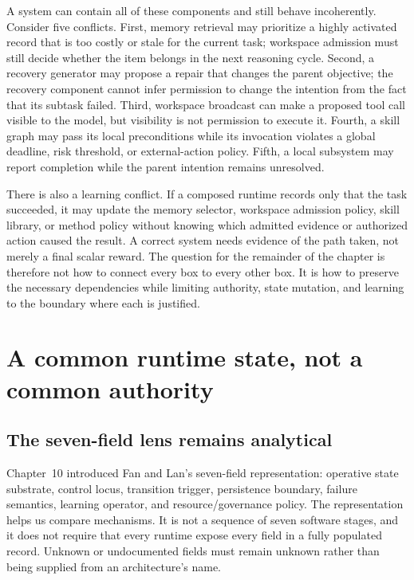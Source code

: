 A system can contain all of these components and still behave incoherently. Consider five conflicts. First, memory retrieval may prioritize a highly activated record that is too costly or stale for the current task; workspace admission must still decide whether the item belongs in the next reasoning cycle. Second, a recovery generator may propose a repair that changes the parent objective; the recovery component cannot infer permission to change the intention from the fact that its subtask failed. Third, workspace broadcast can make a proposed tool call visible to the model, but visibility is not permission to execute it. Fourth, a skill graph may pass its local preconditions while its invocation violates a global deadline, risk threshold, or external-action policy. Fifth, a local subsystem may report completion while the parent intention remains unresolved.

There is also a learning conflict. If a composed runtime records only that the task succeeded, it may update the memory selector, workspace admission policy, skill library, or method policy without knowing which admitted evidence or authorized action caused the result. A correct system needs evidence of the path taken, not merely a final scalar reward. The question for the remainder of the chapter is therefore not how to connect every box to every other box. It is how to preserve the necessary dependencies while limiting authority, state mutation, and learning to the boundary where each is justified.

\section{A common runtime state, not a common authority}
\label{sec:ch18-common-runtime-state}

\subsection{The seven-field lens remains analytical}
\label{subsec:ch18-seven-field-lens}

Chapter~10 introduced Fan and Lan's seven-field representation: operative state substrate, control locus, transition trigger, persistence boundary, failure semantics, learning operator, and resource/governance policy. The representation helps us compare mechanisms. It is not a sequence of seven software stages, and it does not require that every runtime expose every field in a fully populated record. Unknown or undocumented fields must remain unknown rather than being supplied from an architecture's name.

